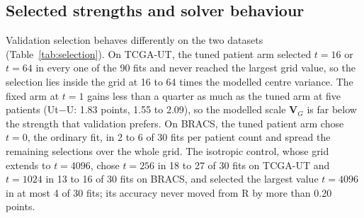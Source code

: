\subsection{Selected strengths and solver behaviour}
\label{sec:selection-results}
Validation selection behaves differently on the two datasets (Table~\ref{tab:selection}). On TCGA-UT, the tuned patient arm selected $t=16$ or $t=64$ in every one of the 90 fits and never reached the largest grid value, so the selection lies inside the grid at 16 to 64 times the modelled centre variance. The fixed arm at $t=1$ gains less than a quarter as much as the tuned arm at five patients (Ut$-$U: 1.83 points, 1.55 to 2.09), so the modelled scale $\mathbf V_G$ is far below the strength that validation prefers. On BRACS, the tuned patient arm chose $t=0$, the ordinary fit, in 2 to 6 of 30 fits per patient count and spread the remaining selections over the whole grid. The isotropic control, whose grid extends to $t=4096$, chose $t=256$ in 18 to 27 of 30 fits on TCGA-UT and $t=1024$ in 13 to 16 of 30 fits on BRACS, and selected the largest value $t=4096$ in at most 4 of 30 fits; its accuracy never moved from R by more than 0.20 points.

